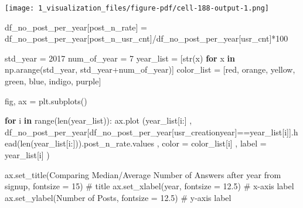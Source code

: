 \documentclass[
  letterpaper,
  DIV=11,
  numbers=noendperiod]{scrartcl}
\newenvironment{Shaded}{\begin{snugshade}}{\end{snugshade}}
\newcommand{\BuiltInTok}[1]{\textcolor[rgb]{0.00,0.23,0.31}{#1}}
\newcommand{\CommentTok}[1]{\textcolor[rgb]{0.37,0.37,0.37}{#1}}
\newcommand{\ControlFlowTok}[1]{\textcolor[rgb]{0.00,0.23,0.31}{\textbf{#1}}}
\newcommand{\DecValTok}[1]{\textcolor[rgb]{0.68,0.00,0.00}{#1}}
\newcommand{\FloatTok}[1]{\textcolor[rgb]{0.68,0.00,0.00}{#1}}
\newcommand{\KeywordTok}[1]{\textcolor[rgb]{0.00,0.23,0.31}{\textbf{#1}}}
\newcommand{\NormalTok}[1]{\textcolor[rgb]{0.00,0.23,0.31}{#1}}
\newcommand{\OperatorTok}[1]{\textcolor[rgb]{0.37,0.37,0.37}{#1}}
\newcommand{\StringTok}[1]{\textcolor[rgb]{0.13,0.47,0.30}{#1}}
\begin{document}
\texttt{[image: 1\_visualization\_files/figure-pdf/cell-188-output-1.png]}

\begin{Shaded}
\begin{Highlighting}[]
\NormalTok{df\_no\_post\_per\_year[}\StringTok{\textquotesingle{}post\_n\_rate\textquotesingle{}}\NormalTok{] }\OperatorTok{=}\NormalTok{ df\_no\_post\_per\_year[}\StringTok{\textquotesingle{}post\_n\_usr\_cnt\textquotesingle{}}\NormalTok{]}\OperatorTok{/}\NormalTok{df\_no\_post\_per\_year[}\StringTok{\textquotesingle{}usr\_cnt\textquotesingle{}}\NormalTok{]}\OperatorTok{*}\DecValTok{100}
\end{Highlighting}
\end{Shaded}

\begin{Shaded}
\begin{Highlighting}[]
\NormalTok{std\_year }\OperatorTok{=} \DecValTok{2017}
\NormalTok{num\_of\_year }\OperatorTok{=} \DecValTok{7}
\NormalTok{year\_list }\OperatorTok{=}\NormalTok{ [}\BuiltInTok{str}\NormalTok{(x) }\ControlFlowTok{for}\NormalTok{ x }\KeywordTok{in}\NormalTok{ np.arange(std\_year, std\_year}\OperatorTok{+}\NormalTok{num\_of\_year)]}
\NormalTok{color\_list }\OperatorTok{=}\NormalTok{ [}\StringTok{\textquotesingle{}red\textquotesingle{}}\NormalTok{, }\StringTok{\textquotesingle{}orange\textquotesingle{}}\NormalTok{, }\StringTok{\textquotesingle{}yellow\textquotesingle{}}\NormalTok{, }\StringTok{\textquotesingle{}green\textquotesingle{}}\NormalTok{, }\StringTok{\textquotesingle{}blue\textquotesingle{}}\NormalTok{, }\StringTok{\textquotesingle{}indigo\textquotesingle{}}\NormalTok{, }\StringTok{\textquotesingle{}purple\textquotesingle{}}\NormalTok{]}

\NormalTok{fig, ax }\OperatorTok{=}\NormalTok{ plt.subplots()}

\ControlFlowTok{for}\NormalTok{ i }\KeywordTok{in} \BuiltInTok{range}\NormalTok{(}\BuiltInTok{len}\NormalTok{(year\_list)):   }
\NormalTok{        ax.plot (year\_list[i:]}
\NormalTok{        , df\_no\_post\_per\_year[df\_no\_post\_per\_year[}\StringTok{\textquotesingle{}usr\_creationyear\textquotesingle{}}\NormalTok{]}\OperatorTok{==}\NormalTok{year\_list[i]].head(}\BuiltInTok{len}\NormalTok{(year\_list[i:])).post\_n\_rate.values}
\NormalTok{        ,  color }\OperatorTok{=}\NormalTok{ color\_list[i]}
\NormalTok{        ,  label }\OperatorTok{=}\NormalTok{ year\_list[i]}
\NormalTok{        ) }


\NormalTok{ax.set\_title(}\StringTok{\textquotesingle{}Comparing Median/Average Number of Answers after year from signup\textquotesingle{}}\NormalTok{, fontsize }\OperatorTok{=} \DecValTok{15}\NormalTok{) }\CommentTok{\# title}
\NormalTok{ax.set\_xlabel(}\StringTok{\textquotesingle{}year\textquotesingle{}}\NormalTok{, fontsize }\OperatorTok{=} \FloatTok{12.5}\NormalTok{) }\CommentTok{\# x{-}axis label}
\NormalTok{ax.set\_ylabel(}\StringTok{\textquotesingle{}Number of Posts\textquotesingle{}}\NormalTok{, fontsize }\OperatorTok{=} \FloatTok{12.5}\NormalTok{) }\CommentTok{\# y{-}axis label}


\end{Highlighting}
\end{Shaded}
\end{document}
